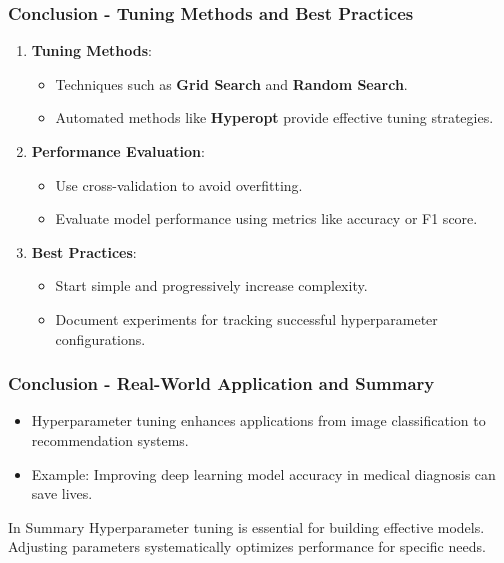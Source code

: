 \documentclass[aspectratio=169]{beamer}
\begin{document}
\begin{frame}[fragile]
    \frametitle{Conclusion - Tuning Methods and Best Practices}
    \begin{enumerate}
        \item \textbf{Tuning Methods}:
        \begin{itemize}
            \item Techniques such as \textbf{Grid Search} and \textbf{Random Search}.
            \item Automated methods like \textbf{Hyperopt} provide effective tuning strategies.
        \end{itemize}
        
        \item \textbf{Performance Evaluation}:
        \begin{itemize}
            \item Use cross-validation to avoid overfitting.
            \item Evaluate model performance using metrics like accuracy or F1 score.
        \end{itemize}
        
        \item \textbf{Best Practices}:
        \begin{itemize}
            \item Start simple and progressively increase complexity.
            \item Document experiments for tracking successful hyperparameter configurations.
        \end{itemize}
    \end{enumerate}
\end{frame}

\begin{frame}[fragile]
    \frametitle{Conclusion - Real-World Application and Summary}
    \begin{itemize}
        \item Hyperparameter tuning enhances applications from image classification to recommendation systems.
        \item Example: Improving deep learning model accuracy in medical diagnosis can save lives.
    \end{itemize}
    \begin{block}{In Summary}
    Hyperparameter tuning is essential for building effective models. Adjusting parameters systematically optimizes performance for specific needs.
    \end{block}
\end{frame}
\end{document}
